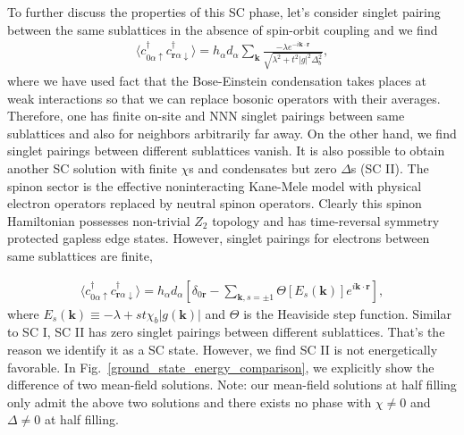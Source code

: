 \documentclass[aps,prb,twocolumn,superscriptaddress,showpacs]{revtex4-1}
\begin{document}
To further discuss the properties of this SC phase, let's consider singlet pairing between the same sublattices in the absence of spin-orbit coupling and we find
\begin{eqnarray}
\label{NNN-pairing-a}
\langle c^{\dag}_{0\alpha\uparrow} c^{\dag}_{\textbf{r}\alpha\downarrow} \rangle
= h_{\alpha} d_{\alpha} \sum_\textbf{k} \frac{-\lambda e^{-i \textbf{k} \cdot \textbf{r}}}{\sqrt{\lambda^2+t^2|g|^2 \Delta_b^2}},
\end{eqnarray}
where we have used fact that the Bose-Einstein condensation takes places at weak interactions so that we can replace bosonic operators with their averages. Therefore, one has finite on-site and NNN singlet pairings between same sublattices and also for neighbors arbitrarily far away. On the other hand, we find singlet pairings between different sublattices vanish. It is also possible to obtain another SC solution with finite $\chi$s and condensates but zero $\Delta$s (SC II).\cite{Vaezi:10} The spinon sector is the effective noninteracting Kane-Mele model with physical electron operators replaced by neutral spinon operators. Clearly this spinon Hamiltonian possesses non-trivial $Z_2$ topology and has time-reversal symmetry protected gapless edge states. However, singlet pairings for electrons between same sublattices are finite,

\begin{eqnarray}
\langle c^{\dag}_{0\alpha\uparrow} c^{\dag}_{\textbf{r}\alpha\downarrow} \rangle=  h_{\alpha}d_{\alpha} \left[\delta_{0\textbf{r}}-\sum_{\textbf{k},s=\pm1}\Theta[E_s(\textbf{k})]e^{ i\textbf{k} \cdot \textbf{r}} \right ]
\label{onsite-pairing-b},
\end{eqnarray}
where $E_s(\textbf{k}) \equiv -\lambda+st\chi_b|g(\textbf{k})|$ and $\Theta$ is the Heaviside step function. Similar to SC I, SC II has zero singlet pairings between different sublattices. That's the reason we identify it as a SC state. However, we find SC II is not energetically favorable. In Fig.~\ref{ground_state_energy_comparison}, we explicitly show the difference of two mean-field solutions. Note: our mean-field solutions at half filling only admit the above two solutions and there exists no phase with $\chi \neq 0$ and $\Delta \neq 0$ at half filling.
\end{document}
